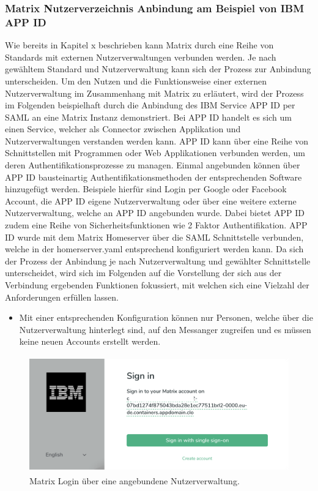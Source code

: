 \subsubsection{Matrix Nutzerverzeichnis Anbindung am Beispiel von IBM APP ID}\label{chapter:vdmf}
Wie bereits in Kapitel x beschrieben kann Matrix durch eine Reihe von Standards mit externen Nutzerverwaltungen verbunden werden.
Je nach gewähltem Standard und Nutzerverwaltung kann sich der Prozess zur Anbindung unterscheiden. Um den Nutzen und die Funktionsweise einer externen Nutzerverwaltung im Zusammenhang mit Matrix zu erläutert, wird der Prozess im Folgenden beispielhaft durch die Anbindung des IBM Service APP ID per SAML an eine Matrix Instanz demonstriert. Bei APP ID handelt es sich um einen Service, welcher als Connector zwischen Applikation und Nutzerverwaltungen verstanden werden kann. APP ID kann über eine Reihe von Schnittstellen mit Programmen oder Web Applikationen verbunden werden, um deren Authentifikationsprozesse zu managen. Einmal angebunden können über APP ID bausteinartig Authentifikationsmethoden der entsprechenden Software hinzugefügt werden. Beispiele hierfür sind Login per Google oder Facebook Account, die APP ID eigene Nutzerverwaltung oder über eine weitere externe Nutzerverwaltung, welche an APP ID angebunden wurde. Dabei bietet APP ID zudem eine Reihe von Sicherheitsfunktionen wie 2 Faktor Authentifikation.
APP ID wurde mit dem Matrix Homeserver über die SAML Schnittstelle verbunden, welche in der homerserver.yaml entsprechend konfiguriert werden kann. Da sich der Prozess der Anbindung je nach Nutzerverwaltung und gewählter Schnittstelle unterscheidet, wird sich im Folgenden auf die Vorstellung der sich aus der Verbindung ergebenden Funktionen fokussiert, mit welchen sich eine Vielzahl der Anforderungen erfüllen lassen.

\begin{itemize}
    \item Mit einer entsprechenden Konfiguration können nur Personen, welche über die Nutzerverwaltung hinterlegt sind, auf den Messanger zugreifen und es müssen keine neuen Accounts erstellt werden. 
\end{itemize}

\begin{figure}[htb]
    \centering
    \includegraphics[height=5cm]{graphics/sso.png}
    \caption[Matrix Login über eine angebundene Nutzerverwaltung]{Matrix Login über eine angebundene Nutzerverwaltung.}
    \label{abb:DHBWLogo}
\end{figure}

